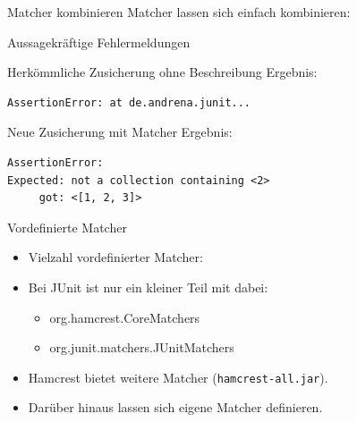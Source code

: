 \begin{frame}[fragile]{Matcher kombinieren}
        Matcher lassen sich einfach kombinieren:
\end{frame}

\begin{frame}[fragile]{Aussagekräftige Fehlermeldungen}
    \begin{block}{Herkömmliche Zusicherung ohne Beschreibung}
Ergebnis:
\begin{lstlisting}
AssertionError: at de.andrena.junit...
\end{lstlisting}
    \end{block}	
\pause
    \begin{block}{Neue Zusicherung mit Matcher}
Ergebnis:
\begin{lstlisting}
AssertionError:
Expected: not a collection containing <2>
     got: <[1, 2, 3]>
\end{lstlisting}
    \end{block}
\end{frame}

\begin{frame}{Vordefinierte Matcher}
    \begin{itemize}
        \item Vielzahl vordefinierter Matcher:
        \item Bei JUnit ist nur ein kleiner Teil mit dabei:
        \begin{itemize}
            \item org.hamcrest.CoreMatchers
            \item org.junit.matchers.JUnitMatchers
        \end{itemize}
        \item Hamcrest bietet weitere Matcher (\texttt{hamcrest-all.jar}).
        \item<alert@2> Darüber hinaus lassen sich eigene Matcher definieren.
    \end{itemize}
\end{frame}

